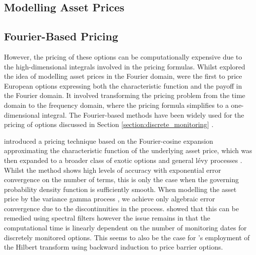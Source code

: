 \documentclass[a4paper]{report}
\begin{document}
\subsection{Modelling Asset Prices}

\subsection{Fourier-Based Pricing}
However, the pricing of these options can be computationally expensive due to the high-dimensional integrals involved in the pricing formulas. Whilst \citet{heston1993closed} explored the idea of modelling asset prices in the Fourier domain, \citet{carr1999option} were the first to price European options expressing both the characteristic function and the payoff in the Fourier domain. It involved transforming the pricing problem from the time domain to the frequency domain, where the pricing formula simplifies to a one-dimensional integral. The Fourier-based methods have been widely used for the pricing of options discussed in Section \ref{section:discrete_monitoring} \citep{eberlein2010analysis}.

\citet{fang2009novel} introduced a pricing technique based on the Fourier-cosine expansion approximating the characteristic function of the underlying asset price, which was then expanded to a broader class of exotic options \citep{fang2009pricing, fang2011fourier} and general l\'evy processes \citep{lord2008fast}. Whilst the method shows high levels of accuracy with exponential error convergence on the number of terms, this is only the case when the governing probability density function is sufficiently smooth. When modelling the asset price by the variance gamma process \citep{madan1998variance}, we achieve only algebraic error convergence due to the discontinuities in the process. \citet{ruijter2015application} showed that this can be remedied using spectral filters however the issue remains in that the computational time is linearly dependent on the number of monitoring dates for discretely monitored options. This seems to also be the case for \citet{feng2008pricing}'s employment of the Hilbert transform using backward induction to price barrier options. 
\end{document}
